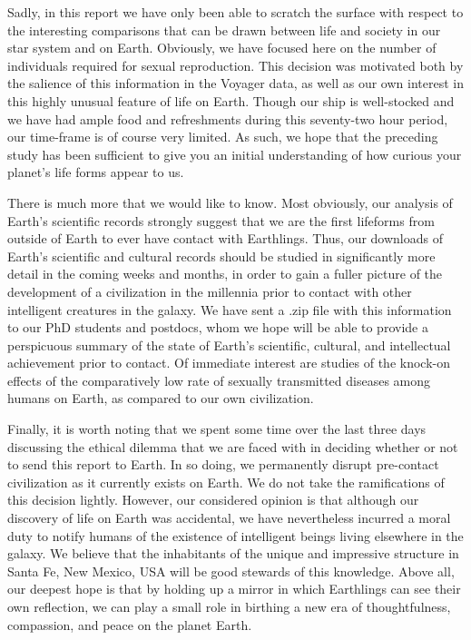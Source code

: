 Sadly, in this report we have only been able to scratch the surface with respect to the interesting comparisons that can be drawn between life and society in our star system and on Earth. Obviously, we have focused here on the number of individuals required for sexual reproduction. This decision was motivated both by the salience of this information in the Voyager data, as well as our own interest in this highly unusual feature of life on Earth. Though our ship is well-stocked and we have had ample food and refreshments during this seventy-two hour period, our time-frame is of course very limited. As such, we hope that the preceding study has been sufficient to give you an initial understanding of how curious your planet's life forms appear to us.\par 


There is much more that we would like to know. Most obviously, our analysis of Earth's scientific records strongly suggest that we are the first lifeforms from outside of Earth to ever have contact with Earthlings. Thus, our downloads of Earth's scientific and cultural records should be studied in significantly more detail in the coming weeks and months, in order to gain a fuller picture of the development of a civilization in the millennia prior to contact with other intelligent creatures in the galaxy. We have sent a .zip file with this information to our PhD students and postdocs, whom we hope will be able to provide a perspicuous summary of the state of Earth's scientific, cultural, and intellectual achievement prior to contact. Of immediate interest are studies of the knock-on effects of the comparatively low rate of sexually transmitted diseases among humans on Earth, as compared to our own civilization.\par 


Finally, it is worth noting that we spent some time over the last three days discussing the ethical dilemma that we are faced with in deciding whether or not to send this report to Earth. In so doing, we permanently disrupt pre-contact civilization as it currently exists on Earth. We do not take the ramifications of this decision lightly. However, our considered opinion is that although our discovery of life on Earth was accidental, we have nevertheless incurred a moral duty to notify humans of the existence of intelligent beings living elsewhere in the galaxy. We believe that the inhabitants of the unique and impressive structure in Santa Fe, New Mexico, USA will be good stewards of this knowledge. Above all, our deepest hope is that by holding up a mirror in which Earthlings can see their own reflection, we can play a small role in birthing a new era of thoughtfulness, compassion, and peace on the planet Earth.\par 

